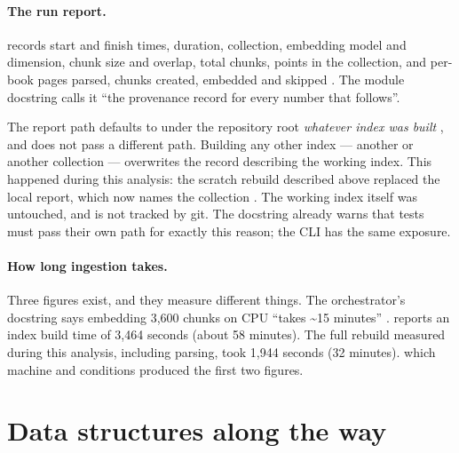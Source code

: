\paragraph{The run report.}  records start and finish times, duration, collection, embedding model and dimension, chunk size and overlap, total chunks, points in the collection, and per-book pages parsed, chunks created, embedded and skipped . The module docstring calls it \enquote{the provenance record for every number that follows}.

\begin{finding}
\label{sec:finding-ingest-report}
The report path defaults to  under the repository root \emph{whatever index was built} , and  does not pass a different path. Building any other index --- another  or another collection --- overwrites the record describing the working index. This happened during this analysis: the scratch rebuild described above replaced the local report, which now names the collection . The working index itself was untouched, and  is not tracked by git. The docstring already warns that tests must pass their own path for exactly this reason; the CLI has the same exposure.
\end{finding}

\paragraph{How long ingestion takes.} Three figures exist, and they measure different things. The orchestrator's docstring says embedding 3,600 chunks on CPU \enquote{takes \textasciitilde15 minutes} .  reports an index build time of 3,464 seconds (about 58 minutes). The full rebuild measured during this analysis, including parsing, took 1,944 seconds (32 minutes). \NotDet{} which machine and conditions produced the first two figures.

\section{Data structures along the way}

